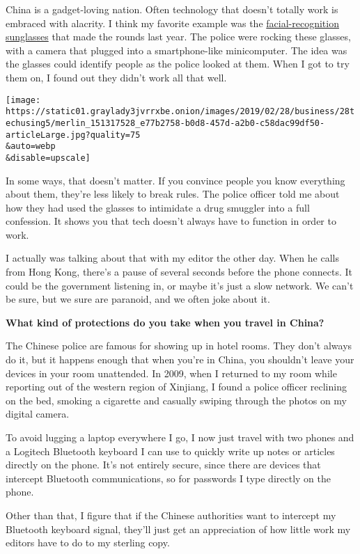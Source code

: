 China is a gadget-loving nation. Often technology that doesn't totally
work is embraced with alacrity. I think my favorite example was the
\href{https://www.nytimes3xbfgragh.onion/2018/07/16/technology/china-surveillance-state.html}{facial-recognition
sunglasses} that made the rounds last year. The police were rocking
these glasses, with a camera that plugged into a smartphone-like
minicomputer. The idea was the glasses could identify people as the
police looked at them. When I got to try them on, I found out they
didn't work all that well.

\texttt{[image: https://static01.graylady3jvrrxbe.onion/images/2019/02/28/business/28techusing5/merlin\_151317528\_e77b2758-b0d8-457d-a2b0-c58dac99df50-articleLarge.jpg?quality=75\\\&auto=webp\\\&disable=upscale]}

In some ways, that doesn't matter. If you convince people you know
everything about them, they're less likely to break rules. The police
officer told me about how they had used the glasses to intimidate a drug
smuggler into a full confession. It shows you that tech doesn't always
have to function in order to work.

I actually was talking about that with my editor the other day. When he
calls from Hong Kong, there's a pause of several seconds before the
phone connects. It could be the government listening in, or maybe it's
just a slow network. We can't be sure, but we sure are paranoid, and we
often joke about it.

\textbf{What kind of protections do you take when you travel in China?}

The Chinese police are famous for showing up in hotel rooms. They don't
always do it, but it happens enough that when you're in China, you
shouldn't leave your devices in your room unattended. In 2009, when I
returned to my room while reporting out of the western region of
Xinjiang, I found a police officer reclining on the bed, smoking a
cigarette and casually swiping through the photos on my digital camera.

To avoid lugging a laptop everywhere I go, I now just travel with two
phones and a Logitech Bluetooth keyboard I can use to quickly write up
notes or articles directly on the phone. It's not entirely secure, since
there are devices that intercept Bluetooth communications, so for
passwords I type directly on the phone.

Other than that, I figure that if the Chinese authorities want to
intercept my Bluetooth keyboard signal, they'll just get an appreciation
of how little work my editors have to do to my sterling copy.

